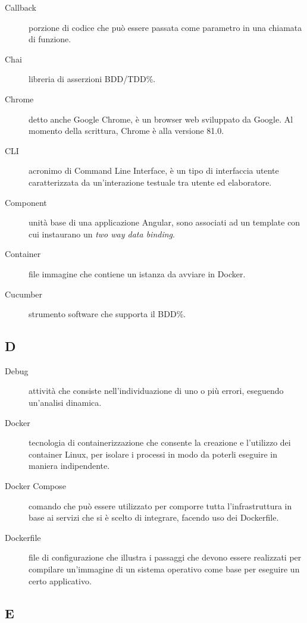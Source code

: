 \documentclass[../manuale-manutentore.tex]{subfiles}
\begin{document}
\begin{description}
    \item[Callback] porzione di codice che può essere passata come parametro in una chiamata di funzione.
    \item[Chai] libreria di asserzioni BDD/TDD\%.
    \item[Chrome] detto anche Google Chrome, è un browser web sviluppato da Google. Al momento della scrittura, Chrome è alla versione 81.0.
    \item[CLI] acronimo di Command Line Interface, è un tipo di interfaccia utente caratterizzata da un'interazione testuale tra utente ed elaboratore.
    \item[Component] unità base di una applicazione Angular, sono associati ad un template con cui instaurano un \textit{two way data binding}.
    \item[Container] file immagine che contiene un istanza da avviare in Docker.
    \item[Cucumber] strumento software che supporta il BDD\%.
\end{description}

\subsection{D}

\begin{description}
    \item[Debug] attività che consiste nell'individuazione di uno o più errori, eseguendo un'analisi dinamica.
    \item[Docker] tecnologia di containerizzazione che consente la creazione e l'utilizzo dei container Linux, per isolare i processi in modo da poterli eseguire in maniera indipendente.
    \item[Docker Compose] comando che può essere utilizzato per comporre tutta l'infrastruttura in base ai servizi che si è scelto di integrare, facendo uso dei Dockerfile.
    \item[Dockerfile] file di configurazione che illustra i passaggi che devono essere realizzati per compilare un'immagine di un sistema operativo come base per eseguire un certo applicativo.
\end{description}

\subsection{E}
\end{document}
